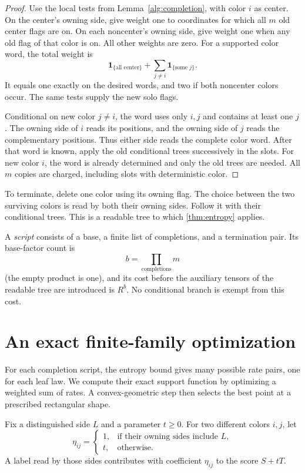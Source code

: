 \documentclass[11pt]{article}
\numberwithin{equation}{section}
\theoremstyle{definition}
\theoremstyle{remark}
\begin{document}
\begin{proof}
Use the local tests from Lemma~\ref{alg:completion}, with color \(i\)
as center.  On the center's owning side, give weight one to coordinates for which
all \(m\) old center flags are on.
On each noncenter's owning side, give weight one when any old flag of
that color is on.
All other weights are zero.
For a supported color word, the total weight is
\[
 \mathbf 1_{\{\text{all center}\}}+
 \sum_{j\ne i}\mathbf 1_{\{\text{some }j\}}.
\]
It equals one exactly on the desired words, and two if both noncenter
colors occur.
The same tests supply the new solo flags.

Conditional on new color \(j\ne i\), the word uses only \(i,j\)
and contains at least one \(j\).
The owning side of \(i\) reads its positions, and the owning side of
\(j\) reads the complementary positions.
Thus either side reads the complete color word.
After that word is known, apply the old conditional trees successively
in the slots.
For new color \(i\), the word is already determined and only the old
trees are needed.
All \(m\) copies are charged, including slots with deterministic color.
\end{proof}

To terminate, delete one color using its owning flag.
The choice between the two surviving colors is read by both their
owning sides.  Follow it with their conditional trees.
This is a readable tree to which \cref{thm:entropy} applies.

A \emph{script} consists of a base, a finite list of completions, and
a termination pair.
Its base-factor count is
\[
 b=\prod_{\text{completions}}m
\]
(the empty product is one), and its cost before the auxiliary tensors
of the readable tree are introduced is \(R^b\).
No conditional branch is exempt from this cost.

\section{An exact finite-family optimization}\label{sec:optimization}

For each completion script, the entropy bound gives many possible
rate pairs, one for each leaf law.  We compute their exact support
function by optimizing a weighted sum of rates.  A convex-geometric
step then selects the best point at a prescribed rectangular shape.

Fix a distinguished side \(L\) and a parameter \(t\ge0\).
For two different colors \(i,j\), let
\[
 \eta_{ij}=
 \begin{cases}
  1,&\text{if their owning sides include }L,\\
  t,&\text{otherwise}.
 \end{cases}
\]
A label read by those sides contributes with coefficient \(\eta_{ij}\)
to the score \(S+tT\).
\end{document}
